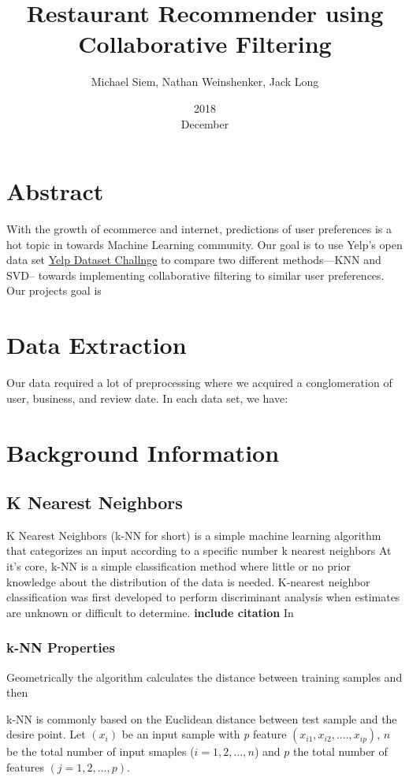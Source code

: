 \documentclass[10pt,a4paper]{article}
\title{Restaurant Recommender using Collaborative Filtering}
\date{2018\\ December}
\author{Michael Siem, Nathan Weinshenker, Jack Long }
\begin{document}
\maketitle
\section{Abstract}
With the growth of ecommerce and internet, predictions of user preferences is a hot topic in towards Machine Learning community. Our goal is to use Yelp's open data set \href {https://www.yelp.com/dataset/challenge} {Yelp Dataset Challnge} to compare two different methods—KNN and SVD-- towards implementing collaborative filtering to similar user preferences.  Our projects goal is 

\section{Data  Extraction}
Our data required a lot of preprocessing where we acquired a conglomeration of user, business, and review date. In each data set, we have: 

\section{Background Information}
	\subsection{K Nearest Neighbors}
	K Nearest Neighbors (k-NN for short) is a simple machine learning algorithm that categorizes an input according to a specific number k nearest neighbors
	At it's core, k-NN is a simple classification method where little or no prior knowledge about the distribution of the data is needed. K-nearest neighbor classification was first developed to perform discriminant analysis when estimates are unknown or difficult to determine. \textbf{include citation} In
		\subsubsection{k-NN Properties}
		Geometrically the algorithm calculates the distance between training samples and then 
		
		k-NN is commonly based on the Euclidean distance between test sample and the desire point.
		Let $(x_{i})$ be an input sample with \textit{p} feature  $(x_{i1}, x_{i2},...., x_{ip})$, $n$ be the total number of input smaples ($ i = 1,2, ... , n$) and $p$ the total number of features $(j = 1,2,...,p)$. 
		
\end{document}
